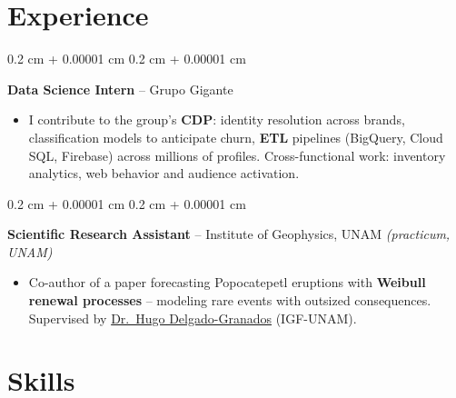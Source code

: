 \documentclass[10pt, letterpaper]{article}
\newenvironment{highlights}{
    \begin{itemize}[
        topsep=0.05 cm,
        parsep=0.05 cm,
        partopsep=0pt,
        itemsep=0pt,
        leftmargin=0.4 cm + 10pt
    ]
}{
    \end{itemize}
}
\newenvironment{onecolentry}{
    \begin{adjustwidth}{
        0.2 cm + 0.00001 cm
    }{
        0.2 cm + 0.00001 cm
    }
}{
    \end{adjustwidth}
}
\let\hrefWithoutArrow\href
\renewcommand{\href}[2]{\hrefWithoutArrow{#1}{\ifthenelse{\equal{#2}{}}{ }{#2 }\raisebox{.15ex}{\footnotesize \faExternalLink*}}}
\begin{document}
    \section{Experience}

        \begin{onecolentry}
            \textbf{Data Science Intern} -- Grupo Gigante
            \begin{highlights}
                \item I contribute to the group's \textbf{CDP}: identity resolution across brands, classification models to anticipate churn, \textbf{ETL} pipelines (BigQuery, Cloud SQL, Firebase) across millions of profiles. Cross-functional work: inventory analytics, web behavior and audience activation.
            \end{highlights}
            \end{onecolentry}

        \vspace{0.02 cm}

        \begin{onecolentry}
            \textbf{Scientific Research Assistant} -- Institute of Geophysics, UNAM \textit{(practicum, UNAM)}
            \begin{highlights}
                \item Co-author of a paper forecasting Popocatepetl eruptions with \textbf{Weibull renewal processes} -- modeling rare events with outsized consequences. Supervised by \hrefWithoutArrow{https://scholar.google.com/citations?user=lDD0DZQAAAAJ}{Dr.\ Hugo Delgado-Granados} (IGF-UNAM).
            \end{highlights}
            \end{onecolentry}


    \section{Skills}
\end{document}

